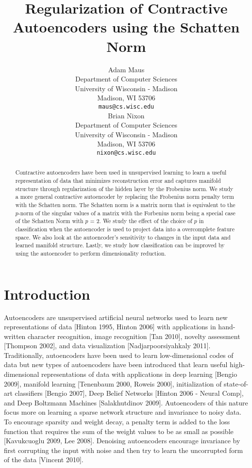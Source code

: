 \documentclass{article} %
\title{Regularization of Contractive Autoencoders using the Schatten Norm}
\author{
Adam Maus \\ 
Department of Computer Sciences \\
University of Wisconsin - Madison \\
Madison, WI 53706 \\
\texttt{maus@cs.wisc.edu} \\
\And
Brian Nixon \\
Department of Computer Sciences \\
University of Wisconsin - Madison \\
Madison, WI 53706 \\
\texttt{nixon@cs.wisc.edu} \\
}
\begin{document}
\maketitle

\begin{abstract}
Contractive autoencoders have been used in unsupervised learning to learn a useful representation of data that minimizes reconstruction error and captures manifold structure through regularization of the hidden layer by the Frobenius norm. We study a more general contractive autoencoder by replacing the Frobenius norm penalty term with the Schatten norm. The Schatten norm is a matrix norm that is equivalent to the $p$-norm of the singular values of a matrix with the Forbenius norm being a special case of the Schatten Norm with $p$ = 2. We study the effect of the choice of $p$ in classification when the autoencoder is used to project data into a overcomplete feature space. We also look at the autoencoder's sensitivity to changes in the input data and learned manifold structure. Lastly, we study how classification can be improved by using the autoencoder to perform dimensionality reduction.
\end{abstract}

\section{Introduction}

Autoencoders are unsupervised artificial neural networks used to learn new representations of data [Hinton 1995, Hinton 2006] with applications in hand-written character recognition, image recognition [Tan 2010], novelty assessment [Thompson 2002], and data visualization [Nadjarpoorsiyahkaly 2011]. Traditionally, autoencoders have been used to learn low-dimensional codes of data but new types of autoencoders have been introduced that learn useful high-dimensional representations of data with applications in deep learning [Bengio 2009], manifold learning [Tenenbaum 2000, Roweis 2000], initialization of state-of-art classifiers [Bengio 2007], Deep Belief Networks [Hinton 2006 - Neural Comp], and Deep Boltzmann Machines [Salakhutdinov 2009]. Autoencoders of this nature focus more on learning a sparse network structure and invariance to noisy data. To encourage sparsity and weight decay, a penalty term is added to the loss function that requires the sum of the weight values to be as small as possible [Kavukcuoglu 2009, Lee 2008]. Denoising autoencoders encourage invariance by first corrupting the input with noise and then try to learn the uncorrupted form of the data [Vincent 2010]. 
\end{document}
